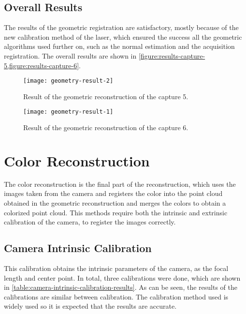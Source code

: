 \subsection{Overall Results}

The results of the geometric registration are satisfactory, mostly because of the new calibration method of the laser, which ensured the success all the geometric algorithms used further on, such as the normal estimation and the acquisition registration. The overall results are shown in \cref{figure:results-capture-5,figure:results-capture-6}.


\begin{figure}[h]

    \centering
    \texttt{[image: geometry-result-2]}

    \caption{Result of the geometric reconstruction of the capture 5.}
    \label{figure:results-capture-5}
    
\end{figure}

\begin{figure}[h]

    \centering
    \texttt{[image: geometry-result-1]}

    \caption{Result of the geometric reconstruction of the capture 6.}
    \label{figure:results-capture-6}
    
\end{figure}

\section{Color Reconstruction}

The color reconstruction is the final part of the reconstruction, which uses the images taken from the camera and registers the color into the point cloud obtained in the geometric reconstruction and merges the colors to obtain a colorized point cloud. This methods require both the intrinsic and extrinsic calibration of the camera, to register the images correctly. 

\subsection{Camera Intrinsic Calibration}

This calibration obtains the intrinsic parameters of the camera, as the focal length and center point. In total, three calibrations were done, which are shown in \cref{table:camera-intrinsic-calibration-results}. As can be seen, the results of the calibrations are similar between calibration. The calibration method used is widely used so it is expected that the results are accurate. 

